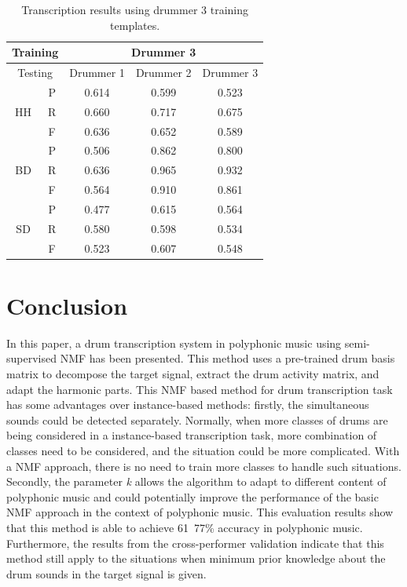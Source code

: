 \documentclass{article}
\begin{document}
\begin{table}[h]
\begin{center}
\begin{tabular}{|c|c|c|c|c|}
\hline
\multicolumn{2}{|c}{Training} & \multicolumn{3}{|c|}{Drummer 3}   \\ \hline
\multicolumn{2}{|c|}{Testing} & Drummer 1 & Drummer 2 & Drummer 3 \\ \hline
\multirow{3}{*}{HH}    & P    & 0.614     & 0.599     & 0.523     \\ \cline{2-5} 
                       & R    & 0.660     & 0.717     & 0.675     \\ \cline{2-5} 
                       & F    & 0.636     & 0.652     & 0.589     \\ \hline
\multirow{3}{*}{BD}    & P    & 0.506     & 0.862     & 0.800     \\ \cline{2-5} 
                       & R    & 0.636     & 0.965     & 0.932     \\ \cline{2-5} 
                       & F    & 0.564     & 0.910     & 0.861     \\ \hline
\multirow{3}{*}{SD}    & P    & 0.477     & 0.615     & 0.564     \\ \cline{2-5} 
                       & R    & 0.580     & 0.598     & 0.534     \\ \cline{2-5} 
                       & F    & 0.523     & 0.607     & 0.548     \\ \hline
\end{tabular}
 \caption{Transcription results using drummer 3 training templates.}
 \label{tab:trainDr3}
\end{center}
\end{table}

\section{Conclusion}\label{sec:Conclusion}

In this paper, a drum transcription system in polyphonic music using semi-supervised NMF has been presented. This method uses a pre-trained drum basis matrix to decompose the target signal, extract the drum activity matrix, and adapt the harmonic parts. This NMF based method for drum transcription task has some advantages over instance-based methods: firstly, the simultaneous sounds could be detected separately. Normally, when more classes of drums are being considered in a instance-based transcription task, more combination of classes need to be considered, and the situation could be more complicated. With a NMF approach, there is no need to train more classes to handle such situations. Secondly, the parameter {\itshape k} allows the algorithm to adapt to different content of polyphonic music and could potentially improve the performance of the basic NMF approach in the context of polyphonic music. This evaluation results show that this method is able to achieve 61~77\% accuracy in polyphonic music. Furthermore, the results from the cross-performer validation indicate that this method still apply to the situations when minimum prior knowledge about the drum sounds in the target signal is given.
\end{document}

